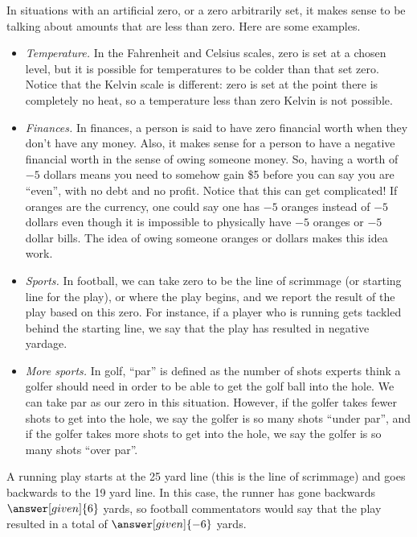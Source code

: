 \documentclass{ximera}
\begin{document}
In situations with an artificial zero, or a zero arbitrarily set, it makes sense to be talking about amounts that are less than zero.  Here are some examples.
\begin{itemize}
	\item {\em Temperature.}  In the Fahrenheit and Celsius scales, zero is set at a chosen 
	level, but it is possible for temperatures to be colder than that set zero.  Notice that the Kelvin scale is different:  zero is set at the point there is completely no heat, so a temperature less than zero Kelvin is not possible.
	\item {\em Finances.}  In finances, a person is said to have zero financial worth when they don't have any money.  Also, it makes sense for a person to have a negative financial worth in the sense of owing someone money.  So, having a worth of $-5$ dollars means you need to somehow gain \$5 before you can say you are ``even'', with no debt and no profit.  Notice that this can get complicated! If oranges are the currency, one could say one has $-5$ oranges instead of $-5$ dollars even though it is impossible to physically have $-5$ oranges or $-5$ dollar bills.  The idea of owing someone oranges or dollars makes this idea work.
	\item {\em Sports.}  In football, we can take zero to be the line of scrimmage (or 
	starting line for the play), or where the play begins, and we report the result of 
	the play based on this zero.  For instance, if a player who is running gets tackled 
	behind the starting line, we say that the play has resulted in negative yardage. 
	\item {\em More sports.} In golf, ``par'' is defined as the number of shots experts think a golfer should 
		  need in order to be able to get the golf ball into the hole. We can take par as 
		  our zero in this situation. However, if the golfer takes fewer shots to get into 
		  the hole, we say the golfer is so many shots ``under par'', and if the golfer 
		  takes more shots to get into the hole, we say the golfer is so many shots 
		  ``over par''.
\end{itemize}
	
	\begin{example}  A running play starts at the 25 yard line (this is the line of 
		scrimmage) and goes backwards to the 19 yard line.  In this case, the runner 
		has gone backwards $\answer[given]{6}$ yards, so football commentators would 
		say that the play resulted in a total of $\answer[given]{-6}$ yards.  \end{example}
		  
\end{document}
